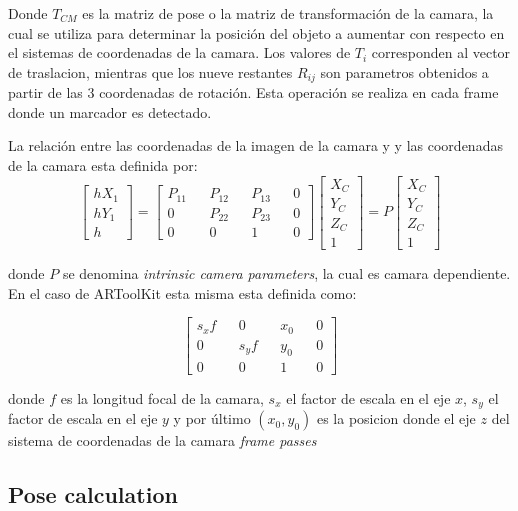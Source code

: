 \documentclass[runningheads]{llncs}
\begin{document}
	Donde $ T_{CM} $ es la matriz de pose o la matriz de transformación de la camara, la cual se utiliza para determinar la posición del objeto a aumentar con respecto en el sistemas de coordenadas de la camara. Los valores de $T_{i}$ corresponden al vector de traslacion, mientras que los nueve restantes $R_{ij}$ son parametros obtenidos a partir de las 3 coordenadas de rotación.
	Esta operación se realiza en cada frame donde un marcador es detectado.
	
	La relación entre las coordenadas de la imagen de la camara y y las coordenadas de la camara esta definida por:
	\[
	\begin{bmatrix}
	hX_{1} \\
	hY_{1} \\
	h 
	\end{bmatrix} =
	\begin{bmatrix}
	P_{11} && P_{12} && P_{13} && 0\\ 
	0 && P_{22} && P_{23} && 0\\
	0 && 0 && 1 && 0
	\end{bmatrix} 
	\begin{bmatrix}
	X_{C} \\
	Y_{C} \\
	Z_{C} \\
	1
	\end{bmatrix} = P \begin{bmatrix}
	X_{C} \\
	Y_{C} \\
	Z_{C} \\
	1
	\end{bmatrix}
	\]
	
	donde $P$ se denomina \textit{intrinsic camera parameters}, la cual es camara dependiente. En el caso de ARToolKit esta misma esta definida como:
	
	\[
	\begin{bmatrix}
	s_{x}f && 0 && x_{0} && 0\\ 
	0 && s_{y}f && y_{0} && 0\\
	0 && 0 && 1 && 0
	\end{bmatrix} 
	\]
	
	donde $f$ es la longitud focal de la camara, $s_{x}$ el factor de escala en el eje $x$, $s_{y}$ el factor de escala en el eje $y$ y por último $(x_{0},y_{0})$ es la posicion donde el eje $z$ del sistema de coordenadas de la camara \textit{frame passes}
	
	
	\subsection{Pose calculation}
	
\end{document}
